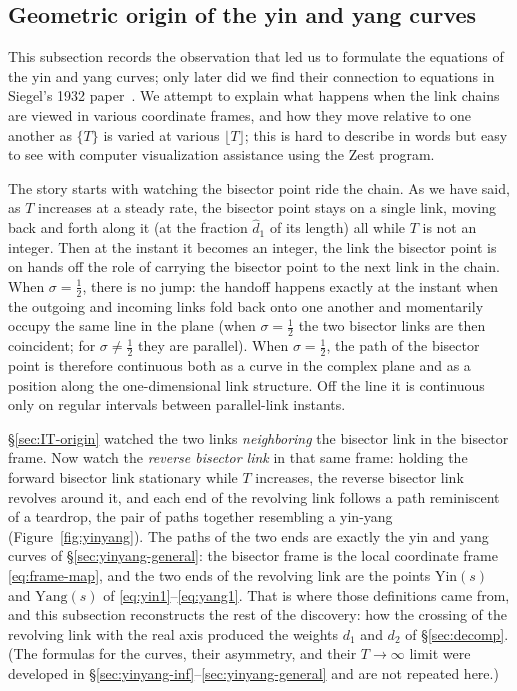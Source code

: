 \documentclass[11pt]{article}
\theoremstyle{definition}
\begin{document}
\clearpage
\subsection{Geometric origin of the yin and yang curves}\label{sec:yinyang-origin}

This subsection records the observation that led us to formulate the
equations of the yin and yang curves; only later did we find their
connection to equations in Siegel's 1932 paper~\cite{Siegel1932}.
We attempt to explain what happens when the link chains are viewed in
various coordinate frames, and how they move relative to one another as
$\{T\}$ is varied at various $\lfloor T\rfloor$; this is hard to describe
in words but easy to see with computer visualization assistance using the
Zest program.

The story starts with watching the bisector point ride the chain. As we have
said, as $T$ increases at a steady rate, the bisector point stays on a single link, moving back and forth along
it (at the fraction $\hat d_1$ of its length) all while $T$ is not an
integer. Then at the instant it becomes an integer, the
link the bisector point is on hands off the role of carrying the bisector
point to the next link in the chain. When $\sigma=\tfrac12$, there is no
jump: the handoff happens exactly at the instant when the outgoing
and incoming links fold back onto one another and momentarily occupy the same
line in the plane (when $\sigma=\tfrac12$ the two bisector links are then
coincident; for $\sigma\ne\tfrac12$ they are parallel). When
$\sigma=\tfrac12$, the path of the bisector point is therefore continuous
both as a curve in the complex plane and as a position along the
one-dimensional link structure. Off the line it is continuous only on
regular intervals between parallel-link instants.

\S\ref{sec:IT-origin} watched the two links \emph{neighboring} the bisector
link in the bisector frame. Now watch the \emph{reverse bisector link} in that
same frame: holding the forward bisector link stationary while $T$ increases,
the reverse bisector link revolves around it, and each end of the revolving
link follows a path reminiscent of a teardrop, the pair of paths together
resembling a yin-yang (Figure~\ref{fig:yinyang}). The paths of the two ends
are exactly the yin and yang curves of \S\ref{sec:yinyang-general}: the
bisector frame is the local coordinate frame \eqref{eq:frame-map}, and the two
ends of the revolving link are the points $\mathrm{Yin}(s)$ and
$\mathrm{Yang}(s)$ of \eqref{eq:yin1}--\eqref{eq:yang1}. That is where those
definitions came from, and this subsection reconstructs the rest of the
discovery: how the crossing of the revolving link with the real axis produced
the weights $d_1$ and $d_2$ of \S\ref{sec:decomp}. (The formulas for the
curves, their asymmetry, and their $T\to\infty$ limit were developed in
\S\ref{sec:yinyang-inf}--\ref{sec:yinyang-general} and are not repeated
here.)
\end{document}
